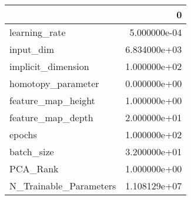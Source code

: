 \begin{tabular}{lr}
\toprule
{} &             0 \\
\midrule
learning\_rate          &  5.000000e-04 \\
input\_dim              &  6.834000e+03 \\
implicit\_dimension     &  1.000000e+02 \\
homotopy\_parameter     &  0.000000e+00 \\
feature\_map\_height     &  1.000000e+00 \\
feature\_map\_depth      &  2.000000e+01 \\
epochs                 &  1.000000e+02 \\
batch\_size             &  3.200000e+01 \\
PCA\_Rank               &  1.000000e+00 \\
N\_Trainable\_Parameters &  1.108129e+07 \\
\bottomrule
\end{tabular}
